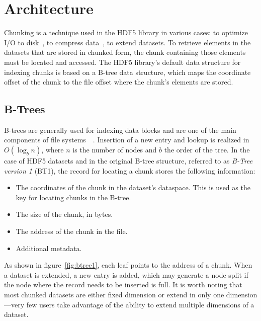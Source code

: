 \section{Architecture}
\label{sec:architecture}

\begin{figure*}
\centering

\caption{Simplified version of original B-tree structure used for indexing 
chunks. In the case of extendable datasets, whenever a new chunk is added to 
the B-tree, its right-most node, if full, is split and a new half empty node 
is created.}
\label{fig:btree1}
\end{figure*}

Chunking is a technique used in the HDF5 library in various cases:
to optimize I/O to disk~\cite{Howison2010}, to compress data~\cite{Folk2011},
to extend datasets.
To retrieve elements in the datasets that are stored in chunked form, the
chunk containing those elements must be located and accessed.
The HDF5 library's default data structure for indexing chunks is based on
a B-tree data structure, which maps the coordinate offset of the chunk to the
file offset where the chunk's elements are stored.

\subsection{B-Trees}

B-trees are generally used for indexing data blocks
and are one of the main components of file systems~\cite{Comer1979}~\cite{Folk1992}. 
Insertion of a new entry and lookup is realized in $O(\log_b{n})$, where $n$ is the
number of nodes and $b$ the order of the tree.
In the case of HDF5 datasets and in the original B-tree structure, referred to
as \textit{B-Tree version 1} (BT1), the record for locating a chunk stores the
following information:
\begin{itemize}
\item The coordinates of the chunk in the dataset's dataspace. This is used
as the key for locating chunks in the B-tree.
\item The size of the chunk, in bytes.
\item The address of the chunk in the file.
\item Additional metadata.
\end{itemize}

As shown in figure~\ref{fig:btree1}, each leaf points to the address of a
chunk. When a dataset is extended, a new entry is added, which may
generate a node split if the node where the record needs to be inserted is full. 
It is worth noting that most chunked datasets are either fixed dimension or
extend in only one dimension---very few users take advantage of the ability to 
extend multiple dimensions of a dataset.

